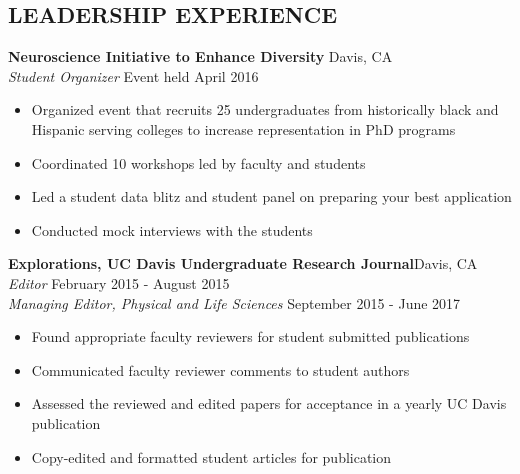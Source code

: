 \documentclass[line,margin,10pt]{res}
\begin{document}
\begin{resume}
 \section{LEADERSHIP EXPERIENCE}
 
 \textbf{Neuroscience Initiative to Enhance Diversity} \hfill
Davis, CA\\
{\sl Student Organizer} \hfill Event held April 2016
\begin{itemize}\itemsep -2pt
\item Organized event that recruits 25 undergraduates from historically black and Hispanic serving colleges to increase representation in PhD programs
\item Coordinated 10 workshops led by faculty and students
\item Led a student data blitz and student panel on preparing your best application
\item Conducted mock interviews with the students
\end{itemize}

\textbf{Explorations, UC Davis Undergraduate Research Journal}\hfill Davis, CA\\{\sl Editor} \hfill February 2015 - August 2015\\
{\sl Managing Editor, Physical and Life Sciences} \hfill September 2015 - June 2017
\begin{itemize}\itemsep -2pt
\item Found appropriate faculty reviewers for student submitted publications
\item Communicated faculty reviewer comments to student authors
\item Assessed the reviewed and edited papers for acceptance in a yearly UC Davis publication
\item Copy-edited and formatted student articles for publication
\end{itemize}



\end{resume}
\end{document}
